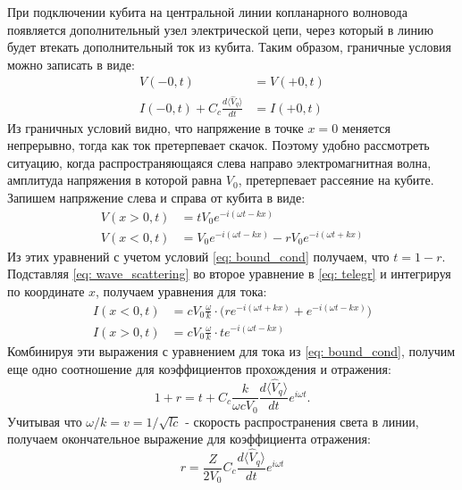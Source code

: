 При подключении кубита на центральной линии копланарного волновода появляется дополнительный узел электрической цепи, через который в линию будет втекать дополнительный ток из кубита. Таким образом, граничные условия можно записать в виде:
\begin{equation}
\begin{split}
	V(-0,t) &= V(+0,t) \\
	I(-0,t) + C_c\frac{d \langle \hat{V}_q \rangle }{dt} &= I(+0,t)
	\label{eq: bound_cond}
\end{split}
\end{equation}
Из граничных условий видно, что напряжение в точке $x\!=\!0$ меняется непрерывно, тогда как ток претерпевает скачок. Поэтому удобно рассмотреть ситуацию, когда распространяющаяся слева направо электромагнитная волна, амплитуда напряжения в которой равна $V_0$, претерпевает рассеяние на кубите. Запишем напряжение слева и справа от кубита в виде:
\begin{equation}
\begin{split}
V(x>0,t) &= t V_0 e^{-i(\omega t - k x)} \\
V(x<0,t) &= V_0 e^{-i(\omega t - k x)} - r V_0 e^{-i(\omega t + k x)} 
\label{eq: wave_scattering}
\end{split}
\end{equation}
Из этих уравнений с учетом условий \eqref{eq: bound_cond} получаем, что $t=1-r$. Подставляя \eqref{eq: wave_scattering} во второе уравнение в \eqref{eq: telegr} и интегрируя по координате $x$, получаем уравнения для тока:
\begin{equation}
\begin{split}
I(x<0,t) &= c V_0 \frac{\omega}{k}\cdot \big( re^{-i(\omega t + k x)} + e^{-i(\omega t - k x)}\big)\\
I(x>0,t) &= c V_0 \frac{\omega}{k} \cdot te^{-i(\omega t - k x)}
\end{split}
\label{eq: cur}
\end{equation}
Комбинируя эти выражения с уравнением для тока из \eqref{eq: bound_cond}, получим еще одно соотношение для коэффициентов прохождения и отражения:
\begin{equation}
1 + r = t + C_c\frac{k}{\omega cV_0}\frac{d \langle \hat{V}_q \rangle }{dt}e^{i\omega t}.
\end{equation}
Учитывая что $\omega/k=v=1/\sqrt{lc}$ - скорость распространения света в линии, получаем окончательное выражение для коэффициента отражения:
\begin{equation}
r = \frac{Z}{2V_0}C_c\frac{d\langle\hat{V}_q\rangle}{dt} e^{i\omega t}
\label{eq: r_derived}
\end{equation}  
